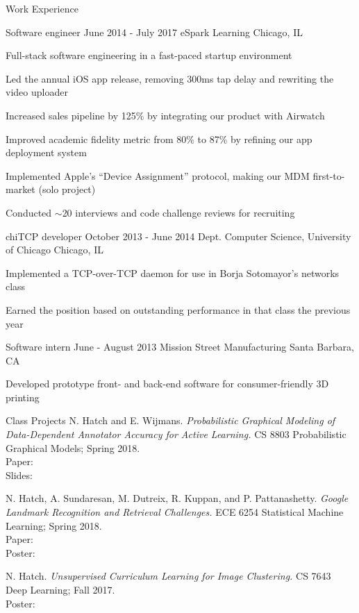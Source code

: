 \documentclass{resume} %
\begin{document}
\begin{rSection}{Work Experience}
\begin{rSubsection}{ Software engineer}{ June 2014 - July 2017}{ eSpark Learning}{ Chicago, IL}
\item Full-stack software engineering in a fast-paced startup environment
\item Led the annual iOS app release, removing 300ms tap delay and rewriting the video uploader
\item Increased sales pipeline by 125\% by integrating our product with Airwatch
\item Improved academic fidelity metric from 80\% to 87\% by refining our app deployment system
\item Implemented Apple's ``Device Assignment'' protocol, making our MDM first-to-market (solo project)
\item Conducted $\sim$20 interviews and code challenge reviews for recruiting
\end{rSubsection}
\begin{rSubsection}{ chiTCP developer}{ October 2013 - June 2014}{ Dept. Computer Science, University of Chicago}{ Chicago, IL}
\item Implemented a TCP-over-TCP daemon for use in Borja Sotomayor's networks class
\item Earned the position based on outstanding performance in that class the previous year
\end{rSubsection}
\begin{rSubsection}{ Software intern}{ June - August 2013}{ Mission Street Manufacturing}{ Santa Barbara, CA}
\item Developed prototype front- and back-end software for consumer-friendly 3D printing
\end{rSubsection}
\end{rSection}

\begin{rSection}{Class Projects}
N. Hatch and E. Wijmans. {\em Probabilistic Graphical Modeling of Data-Dependent Annotator Accuracy for Active Learning.} CS 8803 Probabilistic Graphical Models; Spring 2018. \\
Paper:  \\
Slides: 

N. Hatch, A. Sundaresan, M. Dutreix, R. Kuppan, and P. Pattanashetty. {\em Google Landmark Recognition and Retrieval Challenges.} ECE 6254 Statistical Machine Learning; Spring 2018. \\
Paper:  \\
Poster: 

N. Hatch. {\em Unsupervised Curriculum Learning for Image Clustering.} CS 7643 Deep Learning; Fall 2017. \\
Poster: 
\end{rSection}
\end{document}
